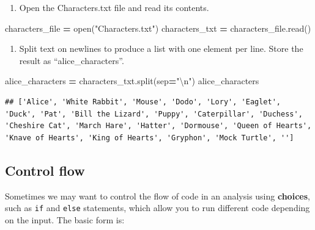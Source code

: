 \documentclass[
]{book}
\newenvironment{Shaded}{\begin{snugshade}}{\end{snugshade}}
\newcommand{\BuiltInTok}[1]{#1}
\newcommand{\CharTok}[1]{\textcolor[rgb]{0.31,0.60,0.02}{#1}}
\newcommand{\NormalTok}[1]{#1}
\newcommand{\OperatorTok}[1]{\textcolor[rgb]{0.81,0.36,0.00}{\textbf{#1}}}
\newcommand{\StringTok}[1]{\textcolor[rgb]{0.31,0.60,0.02}{#1}}
\providecommand{\tightlist}{%
  \setlength{\itemsep}{0pt}\setlength{\parskip}{0pt}}
\begin{document}
\begin{alert}

\begin{enumerate}
\def\labelenumi{\arabic{enumi}.}
\tightlist
\item
  Open the Characters.txt file and read its contents.
\end{enumerate}

\begin{Shaded}
\begin{Highlighting}[]
\NormalTok{characters\_file }\OperatorTok{=} \BuiltInTok{open}\NormalTok{(}\StringTok{"Characters.txt"}\NormalTok{)}
\NormalTok{characters\_txt }\OperatorTok{=}\NormalTok{ characters\_file.read()}
\end{Highlighting}
\end{Shaded}

\begin{enumerate}
\def\labelenumi{\arabic{enumi}.}
\setcounter{enumi}{1}
\tightlist
\item
  Split text on newlines to produce a list with one element per line.
  Store the result as ``alice\_characters''.
\end{enumerate}

\begin{Shaded}
\begin{Highlighting}[]
\NormalTok{alice\_characters }\OperatorTok{=}\NormalTok{ characters\_txt.split(sep}\OperatorTok{=}\StringTok{"}\CharTok{\textbackslash{}n}\StringTok{"}\NormalTok{)}
\NormalTok{alice\_characters}
\end{Highlighting}
\end{Shaded}

\begin{verbatim}
## ['Alice', 'White Rabbit', 'Mouse', 'Dodo', 'Lory', 'Eaglet', 'Duck', 'Pat', 'Bill the Lizard', 'Puppy', 'Caterpillar', 'Duchess', 'Cheshire Cat', 'March Hare', 'Hatter', 'Dormouse', 'Queen of Hearts', 'Knave of Hearts', 'King of Hearts', 'Gryphon', 'Mock Turtle', '']
\end{verbatim}

\end{alert}

\hypertarget{control-flow}{%
\subsection{Control flow}\label{control-flow}}

Sometimes we may want to control the flow of code in an analysis using \textbf{choices},
such as \texttt{if} and \texttt{else} statements, which allow you to run different code depending on the input.
The basic form is:
\end{document}
